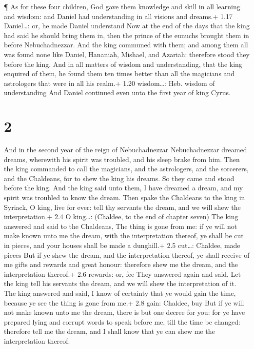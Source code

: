  ¶ As for these four children, God gave them knowledge and
skill in all learning and wisdom: and Daniel had understanding in all
visions and dreams.+ 1.17 Daniel\ldots: or, he made Daniel understand
 Now at the end of the days that the king had said he
should bring them in, then the prince of the eunuchs brought them in
before Nebuchadnezzar.  And the king communed with them;
and among them all was found none like Daniel, Hananiah, Mishael, and
Azariah: therefore stood they before the king.  And in all
matters of wisdom and understanding, that the king enquired of them, he
found them ten times better than all the magicians and astrologers that
were in all his realm.+ 1.20 wisdom\ldots: Heb. wisdom of understanding
 And Daniel continued even unto the first year of king
Cyrus.

\hypertarget{section-1}{%
\section{2}\label{section-1}}

 And in the second year of the reign of Nebuchadnezzar
Nebuchadnezzar dreamed dreams, wherewith his spirit was troubled, and
his sleep brake from him.  Then the king commanded to call
the magicians, and the astrologers, and the sorcerers, and the
Chaldeans, for to shew the king his dreams. So they came and stood
before the king.  And the king said unto them, I have
dreamed a dream, and my spirit was troubled to know the dream.
 Then spake the Chaldeans to the king in Syriack, O king,
live for ever: tell thy servants the dream, and we will shew the
interpretation.+ 2.4 O king\ldots: (Chaldee, to the end of chapter
seven)  The king answered and said to the Chaldeans, The
thing is gone from me: if ye will not make known unto me the dream, with
the interpretation thereof, ye shall be cut in pieces, and your houses
shall be made a dunghill.+ 2.5 cut\ldots: Chaldee, made pieces
 But if ye shew the dream, and the interpretation thereof,
ye shall receive of me gifts and rewards and great honour: therefore
shew me the dream, and the interpretation thereof.+ 2.6 rewards: or, fee
 They answered again and said, Let the king tell his
servants the dream, and we will shew the interpretation of it.
 The king answered and said, I know of certainty that ye
would gain the time, because ye see the thing is gone from me.+ 2.8
gain: Chaldee, buy  But if ye will not make known unto me
the dream, there is but one decree for you: for ye have prepared lying
and corrupt words to speak before me, till the time be changed:
therefore tell me the dream, and I shall know that ye can shew me the
interpretation thereof.

